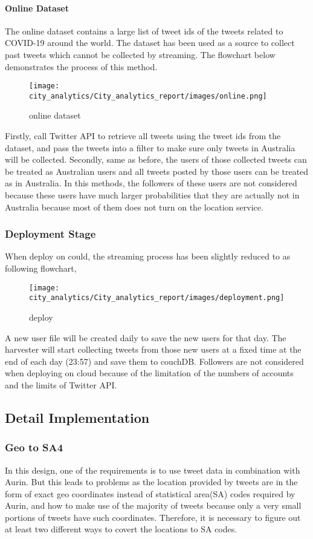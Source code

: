 \paragraph{Online Dataset}

The online dataset contains a large list of tweet ids of the tweets related to COVID-19 around the world. The dataset has been used as a source to collect past tweets which cannot be collected by streaming. The flowchart below demonstrates the process of this method.
\begin{figure}[h!]
\centering
\texttt{[image: city\_analytics/City\_analytics\_report/images/online.png]}
\caption{online dataset}
\label{fig:stream}
\end{figure}

Firstly, call Twitter API to retrieve all tweets using the tweet ids from the dataset, and pass the tweets into a filter to make sure only tweets in Australia will be collected. Secondly, same as before, the users of those collected tweets can be treated as Australian users and all tweets posted by those users can be treated as in Australia. In this methods, the followers of these users are not considered because these users have much larger probabilities that they are actually not in Australia because most of them does not turn on the location service.
\subsubsection{Deployment Stage}
When deploy on could, the streaming process has been slightly reduced to as following flowchart,

\begin{figure}[h!]
\centering
\texttt{[image: city\_analytics/City\_analytics\_report/images/deployment.png]}
\caption{deploy}
\label{fig:stream}
\end{figure}

A new user file will be created daily to save the new users for that day. The harvester will start collecting tweets from those new users at a fixed time at the end of each day (23:57) and save them to couchDB. Followers are not considered when deploying on cloud because of the limitation of the numbers of accounts and the limits of Twitter API.

\subsection{Detail Implementation}

\subsubsection{Geo to SA4}
In this design, one of the requirements is to use tweet data in combination with Aurin. But this leads to problems as the location provided by tweets are in the form of exact geo coordinates instead of statistical area(SA) codes required by Aurin, and how to make use of the majority of tweets because only a very small portions of tweets have such coordinates. Therefore, it is necessary to figure out at least two different ways to covert the locations to SA codes.


